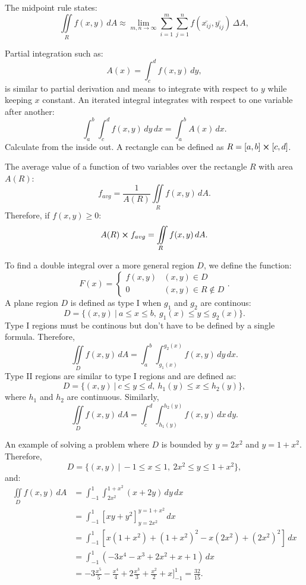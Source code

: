 \documentclass{article}
\begin{document}
The midpoint rule states:
\[\iint\limits_R f(x,y) \,dA \approx \lim_{m,n \to \infty} \sum_{i=1}^{m} \sum_{j=1}^{n} f(\bar{x_{ij}},\bar{y_{ij}}) \, \Delta A,\]

Partial integration such as:
\[A(x) = \int_{c}^{d} f(x,y) \, dy,\]
is similar to partial derivation and means to integrate with respect to $y$
while keeping $x$ constant. An iterated integral integrates with respect
to one variable after another:
\[ \int_{a}^{b} \int_{c}^{d} f(x,y) \, dy \, dx = \int_{a}^{b} A(x) \, dx.\]
Calculate from the inside out. A rectangle can be defined as 
$R=[a,b] \cross [c,d]$.

The average value of a function of two variables over the rectangle $R$
with area $A(R)$:
\[f_{avg} = \frac{1}{A(R)} \iint \limits_R f(x,y) \, dA.\]
Therefore, if $f(x,y) \ge 0$:
\[A(R) \cross f_{avg} = \iint \limits_R f(x,y) \, dA.\]

To find a double integral over a more general region $D$, 
we define the function:
\[ F(x) = \begin{cases} 
      f(x,y) & (x,y) \in D \\
      0 & (x,y) \in R \notin D
   \end{cases}.
\]
A plane region $D$ is defined as type I when $g_1$ and $g_2$ are continous:
\[D = \{(x,y) \ | \ a \le x \le b, \ g_1(x) \le y \le g_2(x)\}.\]
Type I regions must be continous but don't have to be defined by a single 
formula. Therefore,
\[\iint \limits_D f(x,y) \, dA  = \int_{a}^{b} \int_{g_1(x)}^{g_2(x)} f(x,y) \, dy \, dx.\]
Type II regions are similar to type I regions and are defined as:
\[D = \{(x,y) \ | \ c \le y \le d, \ h_1(y) \le x \le h_2(y)\},\]
where $h_1$ and $h_2$ are continuous. Similarly,
\[\iint \limits_D f(x,y) \, dA  = \int_{c}^{d} \int_{h_1(y)}^{h_2(y)} f(x,y) \, dx \, dy.\]

An example of solving a problem where $D$ is bounded by $y=2x^2$
and $y=1+x^2$. Therefore,
\[D = \{(x,y) \ | \ -1 \le x \le 1, \ {2x^2} \le y \le {1+x^2} \},\]
and:
\[
\begin{split}
\iint \limits_D f(x,y) \, dA & = \int_{-1}^{1} \int_{2x^2}^{1+x^2} (x+2y) \,dy\,dx \\
& = \int_{-1}^{1} [xy+y^2]_{y=2x^2}^{y=1+x^2} \, dx \\
& = \int_{-1}^{1} [x(1+x^2) + (1+x^2)^2 - x(2x^2) + (2x^2)^2] \, dx \\
& = \int_{-1}^{1} (-3x^4-x^3+2x^2+x+1) \, dx \\
& = -3\frac{x^5}{5} - \frac{x^4}{4} + 2\frac{x^3}{3} + \frac{x^2}{2} + x \bigg]_{-1}^{1} = \frac{32}{15}. 
\end{split}
\]
\end{document}
